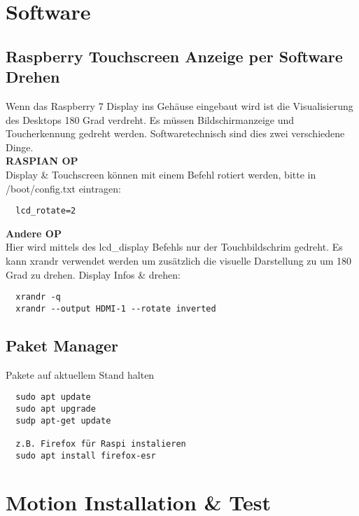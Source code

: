 \newpage
\section{Software}

\subsection{Raspberry Touchscreen Anzeige per Software Drehen}
Wenn das Raspberry 7\grqq{} Display ins Gehäuse eingebaut wird ist die 
Visualisierung des Desktops 180 Grad verdreht. Es müssen Bildschirmanzeige 
und Toucherkennung gedreht werden. Softwaretechnisch sind dies zwei verschiedene 
Dinge.\\

\textbf{RASPIAN OP}\\
Display \& Touchscreen können mit einem Befehl rotiert werden, 
bitte in /boot/config.txt eintragen:
\begin{verbatim}
  lcd_rotate=2
\end{verbatim}

\textbf{Andere OP}\\
Hier wird mittels des lcd\_display Befehls nur der Touchbildschrim 
gedreht. Es kann xrandr verwendet werden um zusätzlich die visuelle Darstellung zu 
um 180 Grad zu drehen. Display Infos \& drehen:
\begin{verbatim}
  xrandr -q
  xrandr --output HDMI-1 --rotate inverted
\end{verbatim}

\subsection{Paket Manager}
Pakete auf aktuellem Stand halten
\begin{verbatim}
  sudo apt update
  sudo apt upgrade
  sudp apt-get update

  z.B. Firefox für Raspi instalieren
  sudo apt install firefox-esr
\end{verbatim}

\section{Motion Installation \& Test}

